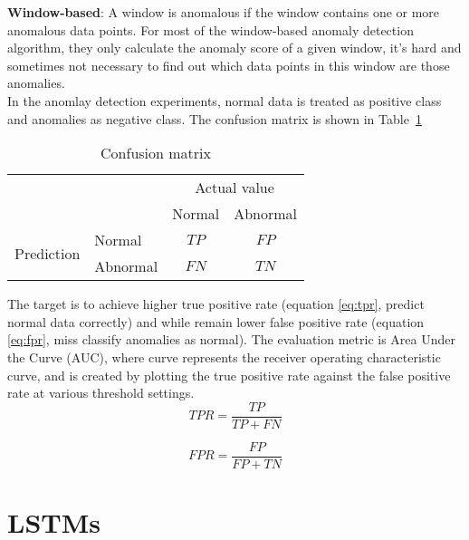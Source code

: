 \textbf{Window-based}: A window is anomalous if the window contains one or more anomalous data points. For most of the window-based anomaly detection algorithm, they only calculate the anomaly score of a given window, it’s hard and sometimes not necessary to find out which data points in this window are those anomalies.\\

In the anomlay detection experiments, normal data is treated as positive class and anomalies as negative class. The confusion matrix is shown in Table~\ref{tab:confusion}

\begin{table}[h]
\begin{center}
\begin{tabular}{l|l|c|c|}
\multicolumn{2}{c}{}&\multicolumn{2}{c}{Actual value}\\
\cline{3-4}
\multicolumn{2}{c|}{}&Normal&Abnormal\\
\cline{2-4}
\multirow{2}{*}{Prediction}& Normal & $TP$ & $FP$\\
\cline{2-4}
& Abnormal & $FN$ & $TN$\\
\cline{2-4}
\end{tabular}
\end{center}
\label{tab:confusion}
\caption{Confusion matrix}
\end{table}

The target is to achieve higher true positive rate (equation \ref{eq:tpr}, predict normal data correctly) and while remain lower false positive rate (equation \ref{eq:fpr}, miss classify anomalies as normal). The evaluation metric is Area Under the Curve (AUC), where curve represents the receiver operating characteristic curve, and is created by plotting the true positive rate against the false positive rate at various threshold settings.
\begin{equation} \label{eq:tpr}
TPR =\dfrac{TP}{TP+FN}
\end{equation}

\begin{equation} \label{eq:fpr}
FPR = \dfrac{FP}{FP+TN}
\end{equation}



\section{LSTMs}
\label{sec:LSTMs}

